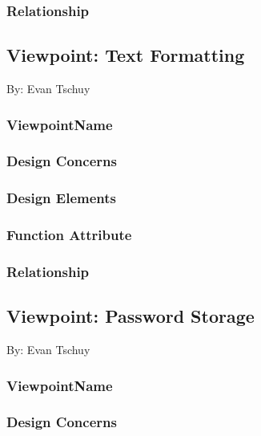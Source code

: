 \documentclass[letterpaper, 10pt, draftclsnofoot, compsoc, onecolumn]{IEEEtran}
\begin{document}
\subsubsection{Relationship}


\subsection{Viewpoint: Text Formatting}
{\noindent By: Evan Tschuy \par}

\subsubsection{ViewpointName}
{\noindent  \par}

\subsubsection{Design Concerns}
{\noindent  \par}

\subsubsection{Design Elements}
{\noindent  \par}

\subsubsection{Function Attribute}
{\noindent  \par}

\subsubsection{Relationship}


\subsection{Viewpoint: Password Storage}
{\noindent By: Evan Tschuy \par}

\subsubsection{ViewpointName}
{\noindent  \par}

\subsubsection{Design Concerns}
{\noindent  \par}
\end{document}
